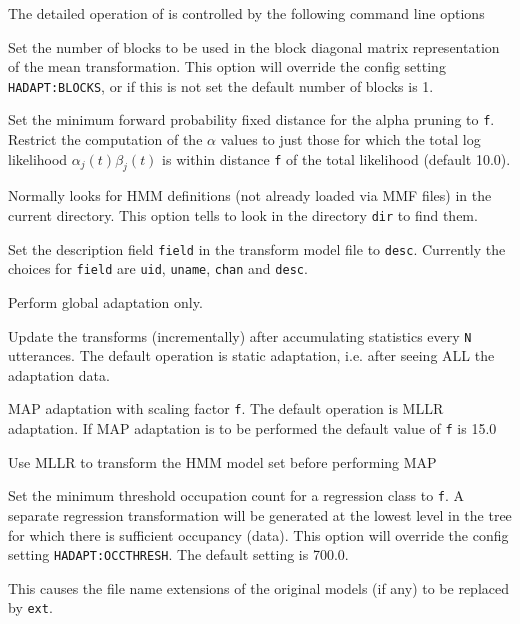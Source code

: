 The detailed operation of  is controlled by the following
command line options
\begin{optlist}

   Set the number of blocks to be used in the block
      diagonal matrix representation of the mean transformation. This
      option will override the config setting \texttt{HADAPT:BLOCKS},
      or if this is not set the default number of blocks is 1.

   Set the minimum forward probability fixed distance for
      the alpha pruning to {\tt f}. Restrict the computation of the
      $\alpha$ values to just those for which the total log likelihood
      $\alpha_j(t)\beta_j(t)$ is within distance {\tt f} of the total
      likelihood (default 10.0).
 
      Normally  looks for HMM definitions
      (not already loaded via MMF files) 
      in the current directory.  This option tells  to look in
      the directory {\tt dir} to find them.

   Set the description field {\tt field} in the
      transform model file to {\tt desc}. Currently the choices for
      {\tt field} are {\tt uid}, {\tt uname}, {\tt chan} and {\tt desc}.

   Perform global adaptation only. 

   Update the transforms (incrementally) after
      accumulating statistics every {\tt N} utterances. The default
      operation is static adaptation, i.e. after seeing ALL the
      adaptation data.

   MAP adaptation with scaling factor {\tt f}. The
      default operation is MLLR adaptation. If MAP adaptation is to be
      performed the default value of {\tt f} is 15.0
 

   Use MLLR to transform the HMM model set before performing MAP

    Set the minimum threshold occupation count for a
      regression class to {\tt f}. A separate regression
      transformation will be generated at the lowest level in the tree
      for which there is sufficient occupancy (data). This option will
      override the config setting \texttt{HADAPT:OCCTHRESH}. The
      default setting is 700.0.
  
    This causes the file name extensions of the
      original models (if any) to be replaced by {\tt ext}.


\end{optlist}

